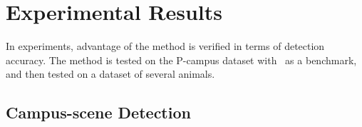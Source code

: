 \section{Experimental Results}
\label{ex4}
In experiments, advantage of the method is verified in terms of detection accuracy. The method is tested on the P-campus dataset with~\citep{ac9} as a benchmark, and then tested on a dataset of several animals.
\subsection{ Campus-scene Detection }
\begin{figure}
\centering
{}
\end{figure}

